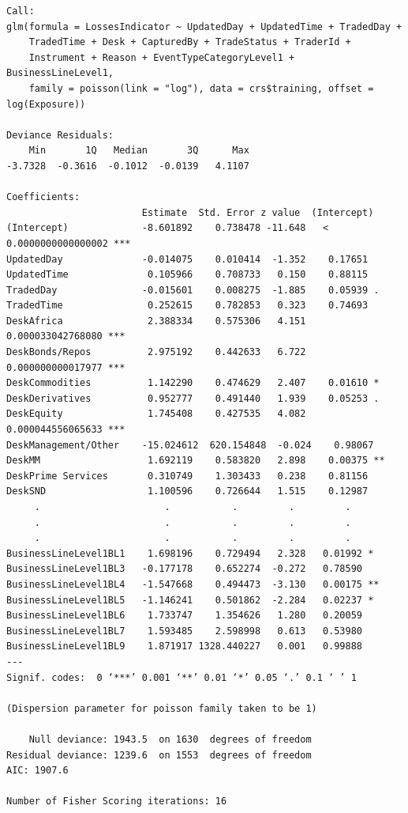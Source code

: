 \documentclass{DissertateUSU}
\begin{document}
\singlespacing
\begin{verbatim}
Call:
glm(formula = LossesIndicator ~ UpdatedDay + UpdatedTime + TradedDay + 
    TradedTime + Desk + CapturedBy + TradeStatus + TraderId + 
    Instrument + Reason + EventTypeCategoryLevel1 + BusinessLineLevel1, 
    family = poisson(link = "log"), data = crs$training, offset = log(Exposure))

Deviance Residuals: 
    Min       1Q   Median       3Q      Max  
-3.7328  -0.3616  -0.1012  -0.0139   4.1107  

Coefficients:
                        Estimate  Std. Error z value  (Intercept)         
(Intercept)             -8.601892    0.738478 -11.648   < 0.0000000000000002 ***
UpdatedDay              -0.014075    0.010414  -1.352    0.17651
UpdatedTime              0.105966    0.708733   0.150    0.88115 
TradedDay               -0.015601    0.008275  -1.885    0.05939 .
TradedTime               0.252615    0.782853   0.323    0.74693
DeskAfrica               2.388334    0.575306   4.151    0.000033042768080 ***
DeskBonds/Repos          2.975192    0.442633   6.722    0.000000000017977 ***
DeskCommodities          1.142290    0.474629   2.407    0.01610 *
DeskDerivatives          0.952777    0.491440   1.939    0.05253 . 
DeskEquity               1.745408    0.427535   4.082    0.000044556065633 ***
DeskManagement/Other    -15.024612  620.154848  -0.024    0.98067
DeskMM                   1.692119    0.583820   2.898    0.00375 ** 
DeskPrime Services       0.310749    1.303433   0.238    0.81156 
DeskSND                  1.100596    0.726644   1.515    0.12987                                 
     .                      .           .         .         .
     .                      .           .         .         .
     .                      .           .         .         .
BusinessLineLevel1BL1    1.698196    0.729494   2.328   0.01992 *
BusinessLineLevel1BL3   -0.177178    0.652274  -0.272   0.78590
BusinessLineLevel1BL4   -1.547668    0.494473  -3.130   0.00175 **
BusinessLineLevel1BL5   -1.146241    0.501862  -2.284   0.02237 *
BusinessLineLevel1BL6    1.733747    1.354626   1.280   0.20059
BusinessLineLevel1BL7    1.593485    2.598998   0.613   0.53980
BusinessLineLevel1BL9    1.871917 1328.440227   0.001   0.99888 
---
Signif. codes:  0 ‘***’ 0.001 ‘**’ 0.01 ‘*’ 0.05 ‘.’ 0.1 ‘ ’ 1

(Dispersion parameter for poisson family taken to be 1)

    Null deviance: 1943.5  on 1630  degrees of freedom
Residual deviance: 1239.6  on 1553  degrees of freedom
AIC: 1907.6

Number of Fisher Scoring iterations: 16

\end{verbatim}
\doublespacing
\end{document}
